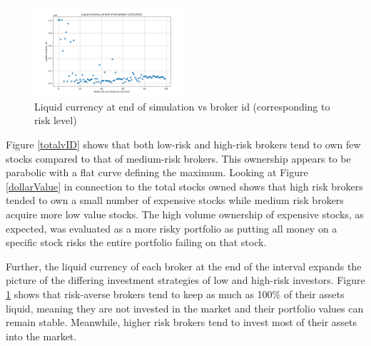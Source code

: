 \documentclass[letterpaper, 11 pt, proceedings]{IEEEtran}
\begin{document}
	\begin{figure}[h]
		\centering
		\includegraphics[width=0.5\textwidth]{liquidCurrency.png}
		\caption{Liquid currency at end of simulation vs broker id (corresponding to risk level)}
		\label{liquidvID}
	\end{figure}
	\FloatBarrier	
		
	Figure \ref{totalvID} shows that both low-risk and high-risk brokers tend to own few stocks compared to that of medium-risk brokers. This ownership appears to be parabolic with a flat curve defining the maximum. Looking at Figure \ref{dollarValue} in connection to the total stocks owned shows that high risk brokers tended to own a small number of expensive stocks while medium risk brokers acquire more low value stocks. The high volume ownership of expensive stocks, as expected, was evaluated as a more risky portfolio as putting all money on a specific stock risks the entire portfolio failing on that stock.

	



	Further, the liquid currency of each broker at the end of the interval expands the picture of the differing investment strategies of low and high-risk investors. Figure \ref{liquidvID} shows that risk-averse brokers tend to keep as much as 100\% of their assets liquid, meaning they are not invested in the market and their portfolio values can remain stable. Meanwhile, higher risk brokers tend to invest most of their assets into the market.
	
\end{document}
